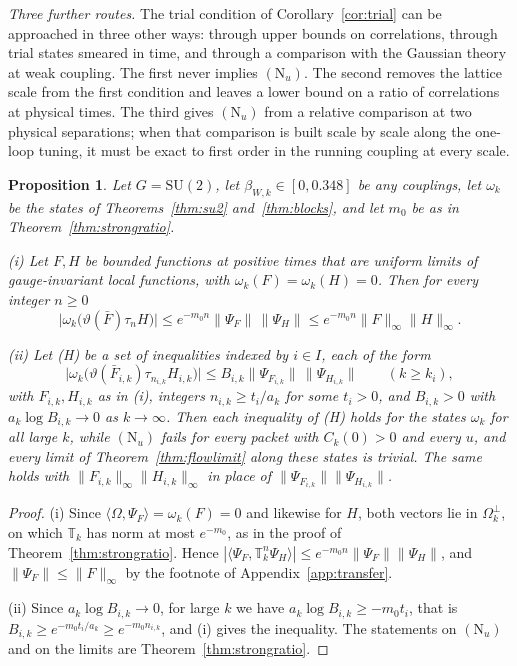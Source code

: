 \documentclass[aps,prd,twocolumn,superscriptaddress,nofootinbib,longbibliography,floatfix,amsmath,amssymb,10pt]{revtex4-2}
\newtheorem{proposition}[theorem]{Proposition}
\theoremstyle{definition}
\theoremstyle{remark}
\newcommand{\SU}{\mathrm{SU}}
\newcommand{\ip}[2]{\langle #1,#2\rangle}
\begin{document}
\emph{Three further routes.} The trial condition of
Corollary~\ref{cor:trial} can be approached in three other ways: through
upper bounds on correlations, through trial states smeared in time, and
through a comparison with the Gaussian theory at weak coupling. The first
never implies $(\mathrm N_u)$. The second removes the lattice
scale from the first condition and leaves a lower bound on a ratio of
correlations at physical times. The third gives $(\mathrm N_u)$ from a
relative comparison at two physical separations; when that comparison is
built scale by scale along the one-loop tuning, it must be exact to first
order in the running coupling at every scale.

\begin{proposition}\label{prop:upperbounds}
Let $G=\SU(2)$, let $\beta_{W,k}\in[0,0.348]$ be any couplings, let
$\omega_k$ be the states of Theorems~\ref{thm:su2} and~\ref{thm:blocks}, and
let $m_0$ be as in Theorem~\ref{thm:strongratio}.

\textup{(i)} Let $F,H$ be bounded functions at positive times that are
uniform limits of gauge-invariant local functions, with
$\omega_k(F)=\omega_k(H)=0$. Then for every integer $n\ge0$
\[
\bigl|\omega_k\bigl(\vartheta(\bar F)\tau_nH\bigr)\bigr|\le
e^{-m_0n}\|\Psi_F\|\,\|\Psi_H\|\le e^{-m_0n}\|F\|_\infty\|H\|_\infty .
\]

\textup{(ii)} Let \textup{(H)} be a set of inequalities indexed by $i\in I$,
each of the form
\[
\bigl|\omega_k\bigl(\vartheta(\bar F_{i,k})\tau_{n_{i,k}}H_{i,k}\bigr)\bigr|
\le B_{i,k}\|\Psi_{F_{i,k}}\|\,\|\Psi_{H_{i,k}}\|\qquad(k\ge k_i),
\]
with $F_{i,k},H_{i,k}$ as in \textup{(i)}, integers $n_{i,k}\ge t_i/a_k$ for
some $t_i>0$, and $B_{i,k}>0$ with $a_k\log B_{i,k}\to0$ as $k\to\infty$.
Then each inequality of \textup{(H)} holds for the states $\omega_k$ for all
large $k$, while $(\mathrm N_u)$ fails for every packet with $C_k(0)>0$ and every $u$,
and
every limit of Theorem~\textup{\ref{thm:flowlimit}} along these states is
trivial. The same holds with $\|F_{i,k}\|_\infty\|H_{i,k}\|_\infty$ in place
of $\|\Psi_{F_{i,k}}\|\|\Psi_{H_{i,k}}\|$.
\end{proposition}

\begin{proof}
(i) Since $\ip\Omega{\Psi_F}=\omega_k(F)=0$ and likewise for $H$, both
vectors lie in $\Omega_k^\perp$, on which $\mathbb T_k$ has norm at most
$e^{-m_0}$, as in the proof of Theorem~\ref{thm:strongratio}. Hence
$|\ip{\Psi_F}{\mathbb T_k^n\Psi_H}|\le e^{-m_0n}\|\Psi_F\|\|\Psi_H\|$, and
$\|\Psi_F\|\le\|F\|_\infty$ by the footnote of Appendix~\ref{app:transfer}.

(ii) Since $a_k\log B_{i,k}\to0$, for large $k$ we have
$a_k\log B_{i,k}\ge-m_0t_i$, that is $B_{i,k}\ge e^{-m_0t_i/a_k}\ge
e^{-m_0n_{i,k}}$, and (i) gives the inequality. The statements on
$(\mathrm N_u)$ and on the limits are Theorem~\ref{thm:strongratio}.
\end{proof}
\end{document}
